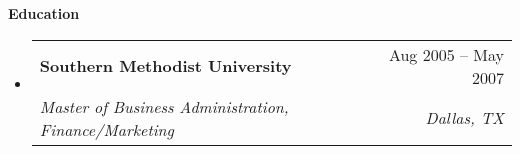 \documentclass[letterpaper,12pt]{article}[leftmargin=*]
\makeatletter
\def \entryspacing {-0pt}
\renewcommand{\section}[2]{\vspace{5pt}
  \colorbox{secondary}{\color{white}\raggedbottom\normalsize\textbf{{#1}{\hspace{7pt}#2}}}
}
\newcommand{\resumeEntryStart}{\begin{itemize}[leftmargin=2.5mm]}
\newcommand{\resumeEntryEnd}{\end{itemize}\vspace{\entryspacing}}
\newcommand{\resumeItemListStart}{\begin{itemize}[leftmargin=4.5mm]}
\newcommand{\resumeItemListEnd}{\end{itemize}}
\newcommand{\resumeItem}[1]{
\item\small{
  {#1 \vspace{-2pt}}
}
}
\newcommand{\resumeEntryTSDL}[4]{
  \vspace{-1pt}\item[]
  \begin{tabularx}{0.97\textwidth}{X@{\hspace{60pt}}r}
    \textbf{\color{primary}#1} & {\firabook\color{accent}\small#2} \\
    \textit{\color{accent}\small#3} & \textit{\color{accent}\small#4} \\
  \end{tabularx}\vspace{-6pt}
}
\newcommand{\resumeEntryTD}[2]{
  \vspace{-1pt}\item[]
  \begin{tabularx}{0.97\textwidth}{X@{\hspace{60pt}}r}
    \textbf{\color{primary}#1} & {\firabook\color{accent}\small#2} \\
  \end{tabularx}\vspace{-6pt}
}
\makeatother
\begin{document}





\section{\faGraduationCap}{Education}

 {
\resumeEntryStart
\resumeEntryTSDL
    {Southern Methodist University}{Aug 2005 -- May 2007}
    {Master of Business Administration, Finance/Marketing}{Dallas, TX}
\resumeEntryEnd
}{}
\end{document}
